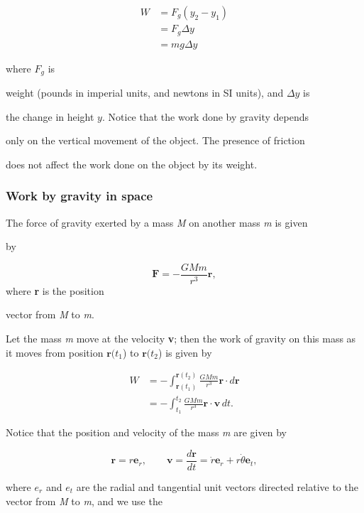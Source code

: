 \begin{align}
W &= F_g (y_2 - y_1) \\&= F_g \Delta y \\&= mg \Delta y
\end{align}


where $F_g$ is

weight (pounds in imperial units, and newtons in SI units), and $\Delta y$ is

the change in height $y$. Notice that the work done by gravity depends

only on the vertical movement of the object. The presence of friction

does not affect the work done on the object by its weight.


\subsubsection{Work by gravity in space}
\label{sss:work-670c}


The force of gravity exerted by a mass \textit{M} on another mass \textit{m} is given

by


\[
\mathbf{F}=-\frac{GMm}{r^3}\mathbf{r},
\] where \textbf{r} is the position

vector from \textit{M} to \textit{m}.


Let the mass \textit{m} move at the velocity \textbf{v}; then the work of gravity on this mass as it moves from position $\mathbf{r}(t_1$) to $\mathbf{r}(t_2$) is given by


\begin{align}
W &= -\int^{\mathbf{r}(t_2)} _{\mathbf{r}(t_1)}\frac{GMm}{r^3}\mathbf{r}\cdot d\mathbf{r} \\&= -\int^{t_2} _{t_1}\frac{GMm}{r^3}\mathbf{r}\cdot\mathbf{v}\,dt.
\end{align}


Notice that the position and velocity of the mass \textit{m} are given by


\[
\mathbf{r} = r\mathbf{e} _r, \qquad\mathbf{v} =  \frac{d\mathbf{r}}{dt} = \dot{r}\mathbf{e} _r + r\dot{\theta}\mathbf{e} _t,
\]

where $e_r$ and $e_t$ are the radial and tangential unit vectors directed relative to the vector from \textit{M} to \textit{m}, and we use the

